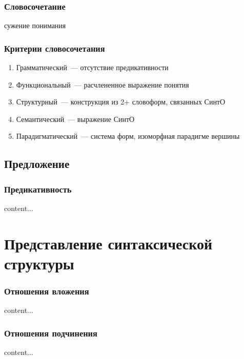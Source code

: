 \begin{frame}
  \frametitle{Словосочетание}

  сужение понимания
\end{frame}

\begin{frame}
  \frametitle{Критерии словосочетания}

  \begin{enumerate}
    \item Грамматический~--- отсутствие предикативности
    \item Функциональный~--- расчлененное выражение понятия
    \item Структурный~--- конструкция из 2+ словоформ, связанных СинтО
    \item Семантический~--- выражение СинтО
    \item Парадигматический~--- система форм, изоморфная парадигме вершины
  \end{enumerate}
\end{frame}

\subsection{Предложение}

\begin{frame}
  \frametitle{Предикативность}
  content...
\end{frame}

\section{Представление синтаксической структуры}
\frame{\tableofcontents[currentsection]}

\begin{frame}
  \frametitle{Отношения вложения}
  content...
\end{frame}

\begin{frame}
  \frametitle{Отношения подчинения}
  content...
\end{frame}
